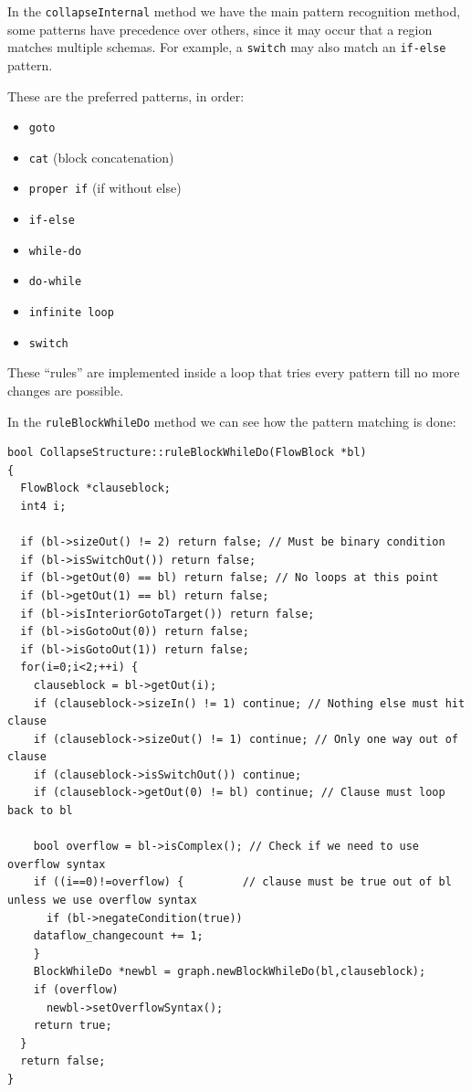 In the \texttt{collapseInternal} method we have the main pattern recognition method, 
some patterns have precedence over others, since it may occur that a region matches 
multiple schemas. For example, a \texttt{switch} may also match an \texttt{if-else} pattern. 

These are the preferred patterns, in order:
\begin{itemize}
    \item \texttt{goto}
    \item \texttt{cat} (block concatenation)
    \item \texttt{proper if} (if without else)
    \item \texttt{if-else}
    \item \texttt{while-do}
    \item \texttt{do-while}
    \item \texttt{infinite loop}
    \item \texttt{switch}
\end{itemize}
These ``rules'' are implemented inside a loop that tries every pattern till no more changes are possible.

In the \texttt{ruleBlockWhileDo} method we can see how the pattern matching is done:

\begin{lstlisting}[style=Cstyle]
bool CollapseStructure::ruleBlockWhileDo(FlowBlock *bl)
{
  FlowBlock *clauseblock;
  int4 i;

  if (bl->sizeOut() != 2) return false; // Must be binary condition
  if (bl->isSwitchOut()) return false;
  if (bl->getOut(0) == bl) return false; // No loops at this point
  if (bl->getOut(1) == bl) return false;
  if (bl->isInteriorGotoTarget()) return false;
  if (bl->isGotoOut(0)) return false;
  if (bl->isGotoOut(1)) return false;
  for(i=0;i<2;++i) {
    clauseblock = bl->getOut(i);
    if (clauseblock->sizeIn() != 1) continue; // Nothing else must hit clause
    if (clauseblock->sizeOut() != 1) continue; // Only one way out of clause
    if (clauseblock->isSwitchOut()) continue;
    if (clauseblock->getOut(0) != bl) continue; // Clause must loop back to bl

    bool overflow = bl->isComplex(); // Check if we need to use overflow syntax
    if ((i==0)!=overflow) {			// clause must be true out of bl unless we use overflow syntax
      if (bl->negateCondition(true))
	dataflow_changecount += 1;
    }
    BlockWhileDo *newbl = graph.newBlockWhileDo(bl,clauseblock);
    if (overflow)
      newbl->setOverflowSyntax();
    return true;
  }
  return false;
}
\end{lstlisting}

